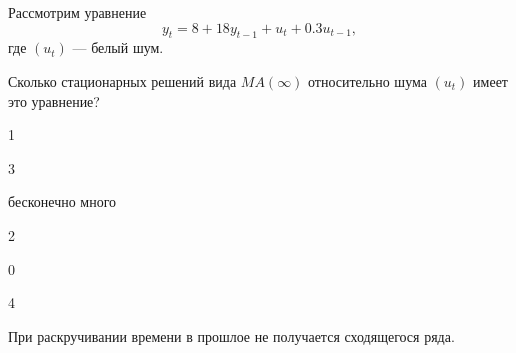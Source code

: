 
\begin{question}
Рассмотрим уравнение
\[
y_t = 8 + 18 y_{t-1} +  u_t + 0.3 u_{t-1},
\]
где \((u_t)\) --- белый шум.

Сколько стационарных решений вида \(MA(\infty)\) относительно шума \((u_t)\) имеет это уравнение?
\begin{answerlist}
  \item 1
  \item 3
  \item бесконечно много
  \item 2
  \item 0
  \item 4
\end{answerlist}
\end{question}

\begin{solution}
При раскручивании времени в прошлое не получается сходящегося ряда.
\end{solution}

